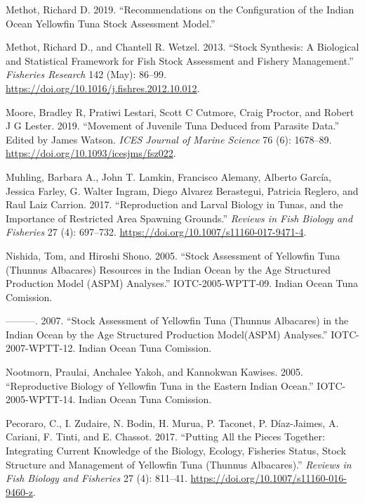 \documentclass[
]{scrartcl}
\newlength{\cslhangindent}
\newenvironment{CSLReferences}[2] %
 {\begin{list}{}{%
  \setlength{\itemindent}{0pt}
  \setlength{\leftmargin}{0pt}
  \setlength{\parsep}{0pt}
  \ifodd #1
   \setlength{\leftmargin}{\cslhangindent}
   \setlength{\itemindent}{-1\cslhangindent}
  \fi
  \setlength{\itemsep}{#2\baselineskip}}}
 {\end{list}}
\begin{document}
\begin{CSLReferences}{1}{0}
Methot, Richard D. 2019. {``Recommendations on the Configuration of the
{Indian Ocean} Yellowfin Tuna Stock Assessment Model.''}

Methot, Richard D., and Chantell R. Wetzel. 2013. {``Stock Synthesis:
{A} Biological and Statistical Framework for Fish Stock Assessment and
Fishery Management.''} \emph{Fisheries Research} 142 (May): 86--99.
\url{https://doi.org/10.1016/j.fishres.2012.10.012}.

Moore, Bradley R, Pratiwi Lestari, Scott C Cutmore, Craig Proctor, and
Robert J G Lester. 2019. {``Movement of Juvenile Tuna Deduced from
Parasite Data.''} Edited by James Watson. \emph{ICES Journal of Marine
Science} 76 (6): 1678--89. \url{https://doi.org/10.1093/icesjms/fsz022}.

Muhling, Barbara A., John T. Lamkin, Francisco Alemany, Alberto García,
Jessica Farley, G. Walter Ingram, Diego Alvarez Berastegui, Patricia
Reglero, and Raul Laiz Carrion. 2017. {``Reproduction and Larval Biology
in Tunas, and the Importance of Restricted Area Spawning Grounds.''}
\emph{Reviews in Fish Biology and Fisheries} 27 (4): 697--732.
\url{https://doi.org/10.1007/s11160-017-9471-4}.

Nishida, Tom, and Hiroshi Shono. 2005. {``Stock Assessment of Yellowfin
Tuna ({Thunnus} Albacares) Resources in the {Indian Ocean} by the Age
Structured Production Model ({ASPM}) Analyses.''} IOTC-2005-WPTT-09.
Indian Ocean Tuna Comission.

---------. 2007. {``Stock Assessment of Yellowfin Tuna ({Thunnus}
Albacares) in the {Indian Ocean} by the Age Structured Production
Model({ASPM}) Analyses.''} IOTC-2007-WPTT-12. Indian Ocean Tuna
Comission.

Nootmorn, Praulai, Anchalee Yakoh, and Kannokwan Kawises. 2005.
{``Reproductive Biology of Yellowfin Tuna in the Eastern {Indian
Ocean}.''} IOTC-2005-WPTT-14. Indian Ocean Tuna Comission.

Pecoraro, C., I. Zudaire, N. Bodin, H. Murua, P. Taconet, P.
Díaz-Jaimes, A. Cariani, F. Tinti, and E. Chassot. 2017. {``Putting All
the Pieces Together: Integrating Current Knowledge of the Biology,
Ecology, Fisheries Status, Stock Structure and Management of Yellowfin
Tuna ({Thunnus} Albacares).''} \emph{Reviews in Fish Biology and
Fisheries} 27 (4): 811--41.
\url{https://doi.org/10.1007/s11160-016-9460-z}.


\end{CSLReferences}
\end{document}
